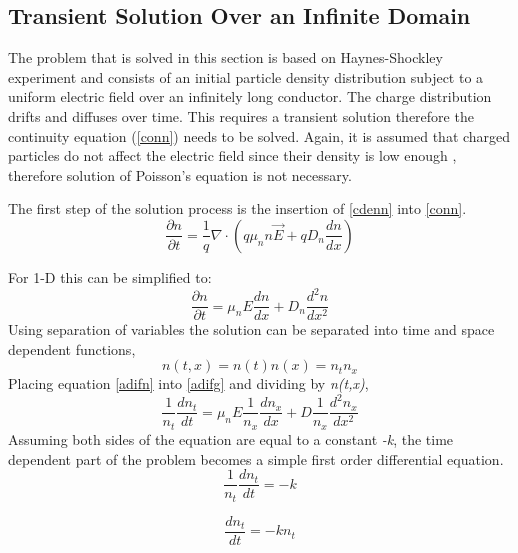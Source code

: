 \begin{doublespace}
\subsection{Transient Solution Over an Infinite Domain}

The problem that is solved in this section is based on Haynes-Shockley experiment\cite{1949PhRv...75..691H} and consists of an initial particle density distribution subject to a uniform electric field over an infinitely long conductor. The charge distribution drifts and diffuses over time. This requires a transient solution  therefore the continuity equation (\ref{conn}) needs to be solved. Again, it is assumed that charged particles do not affect the electric field since their density is low enough , therefore solution of Poisson's equation is not necessary. 

The first step of the solution process is the insertion of \eqref{cdenn} into \eqref{conn}.
\begin{equation}
\frac{\partial n}{\partial t} = \frac{1}{q}\nabla \cdot (q \mu_{n} n \vec{E}+qD_{n} \frac{dn}{dx} )
\end{equation}

For 1-D this can be simplified to:
\begin{equation}
\frac{\partial n}{\partial t} = \mu_n E \frac{d n}{d x}+D_{n}\frac{d^{2}n}{dx^{2}}
\label{adifg}
\end{equation}
Using separation of variables the solution can be separated into time and space dependent functions\cite{NumModel},
\begin{equation}
n(t,x)=n(t)n(x)=n_t n_x
\label{adifn}
\end{equation}
Placing equation \eqref{adifn} into \eqref{adifg} and dividing by \textit{n(t,x)},
\begin{equation}
\frac{1}{n_{t}}\frac{d n_{t}}{d t}=\mu_n E \frac{1}{n_{x}}\frac{d n_{x}}{dx}+D\frac{1}{n_{x}}\frac{d^2 n_{x}}{dx^2}
\label{Adif}
\end{equation}
Assuming both sides of the equation are equal to a constant \textit{-k}, the time dependent part of the problem becomes a simple first order differential equation.
\begin{equation}
\nonumber
\frac{1}{n_{t}}\frac{d n_{t}}{dt}=-k
\end{equation}

\begin{equation}
\nonumber
\frac{d n_{t}}{d t}=-kn_t
\end{equation}


\end{doublespace}
